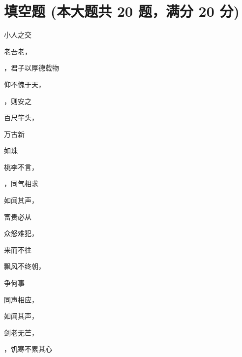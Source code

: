 \documentclass[12pt, a4paper, addpoints]{exam}
\begin{document}
\section{\normalsize{填空题 (本大题共 20 题，满分 20 分)}}
\hspace{1.5cm}
\begin{multicols}{2}
\begin{questions}
\question[1] 小人之交\uline{\qquad\qquad\qquad}

\question[1] 老吾老，\uline{\qquad\qquad\qquad}

\question[1] \uline{\qquad\qquad\qquad}，君子以厚德载物

\question[1] 仰不愧于天，\uline{\qquad\qquad\qquad}

\question[1] \uline{\qquad\qquad\qquad}，则安之

\question[1] 百尺竿头，\uline{\qquad\qquad\qquad}

\question[1] \uline{\qquad\qquad\qquad}万古新

\question[1] \uline{\qquad\qquad\qquad}如珠

\question[1] 桃李不言，\uline{\qquad\qquad\qquad}

\question[1] \uline{\qquad\qquad\qquad}，同气相求

\question[1] 如闻其声，\uline{\qquad\qquad\qquad}

\question[1] 富贵必从\uline{\qquad\qquad\qquad}

\question[1] 众怒难犯，\uline{\qquad\qquad\qquad}

\question[1] 来而不往\uline{\qquad\qquad\qquad}

\question[1] 飘风不终朝，\uline{\qquad\qquad\qquad}

\question[1] \uline{\qquad\qquad\qquad}争何事

\question[1] 同声相应，\uline{\qquad\qquad\qquad}

\question[1] 如闻其声，\uline{\qquad\qquad\qquad}

\question[1] 剑老无芒，\uline{\qquad\qquad\qquad}

\question[1] \uline{\qquad\qquad\qquad}，饥寒不累其心

\end{questions}
\end{multicols}
\end{document}
